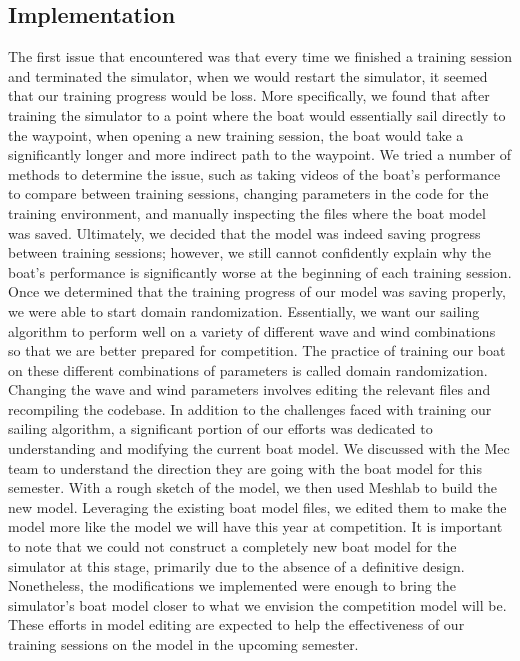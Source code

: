 \documentclass{article}
\begin{document}
\subsection{Implementation}
The first issue that encountered was that every time we finished a training session and terminated the simulator, when we would restart the simulator, it seemed that our training progress would be loss. More specifically, we found that after training the simulator to a point where the boat would essentially sail directly to the waypoint, when opening a new training session, the boat would take a significantly longer and more indirect path to the waypoint. We tried a number of methods to determine the issue, such as taking videos of the boat's performance to compare between training sessions, changing parameters in the code for the training environment, and manually inspecting the files where the boat model was saved. Ultimately, we decided that the model was indeed saving progress between training sessions; however, we still cannot confidently explain why the boat's performance is significantly worse at the beginning of each training session. \\
\indent Once we determined that the training progress of our model was saving properly, we were able to start domain randomization. Essentially, we want our sailing algorithm to perform well on a variety of different wave and wind combinations so that we are better prepared for competition. The practice of training our boat on these different combinations of parameters is called domain randomization. Changing the wave and wind parameters involves editing the relevant files and recompiling the codebase. 
\indent In addition to the challenges faced with training our sailing algorithm, a significant portion of our efforts was dedicated to understanding and modifying the current boat model. We discussed with the Mec team to understand the direction they are going with the boat model for this semester. With a rough sketch of the model, we then used Meshlab to build the new model. Leveraging the existing boat model files, we edited them to make the model more like the model we will have this year at competition. It is important to note that we could not construct a completely new boat model for the simulator at this stage, primarily due to the absence of a definitive design. Nonetheless, the modifications we implemented were enough to bring the simulator's boat model closer to what we envision the competition model will be. These efforts in model editing are expected to help the effectiveness of our training sessions on the model in the upcoming semester.
\newpage
% 







% 
\end{document}
